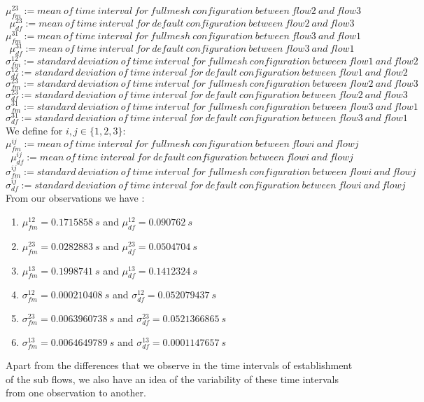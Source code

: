 \documentclass[a4paper,11pt]{article}
\begin{document}
			$$\mu_{fm}^{23} := mean\ of\ time\ interval\ for\ fullmesh\ configuration\ between\ flow2\ and\ flow3$$ 
			$$\mu_{df}^{23} := mean\ of\ time\ interval\ for\ default\ configuration\ between\ flow2\ and\ flow3$$
			$$\mu_{fm}^{31} := mean\ of\ time\ interval\ for\ fullmesh\ configuration\ between\ flow3\ and\ flow1$$ 
			$$\mu_{df}^{31} := mean\ of\ time\ interval\ for\ default\ configuration\ between\ flow3\ and\ flow1$$
			$$\sigma_{fm}^{12} := standard\ deviation\ of\ time\ interval\ for\ fullmesh\ configuration\ between\ flow1\ and\ flow2$$
			$$\sigma_{df}^{12} := standard\ deviation\ of\ time\ interval\ for\ default\ configuration\ between\ flow1\ and\ flow2$$
			$$\sigma_{fm}^{23} := standard\ deviation\ of\ time\ interval\ for\ fullmesh\ configuration\ between\ flow2\ and\ flow3$$
			$$\sigma_{df}^{23} := standard\ deviation\ of\ time\ interval\ for\ default\ configuration\ between\ flow2\ and\ flow3$$
			$$\sigma_{fm}^{31} := standard\ deviation\ of\ time\ interval\ for\ fullmesh\ configuration\ between\ flow3\ and\ flow1$$
			$$\sigma_{df}^{31} := standard\ deviation\ of\ time\ interval\ for\ default\ configuration\ between\ flow3\ and\ flow1$$
			\fi
			We define for $i,j \in \{1, 2, 3\}$:
			$$\mu_{fm}^{ij} := mean\ of\ time\ interval\ for\ fullmesh\ configuration\ between\ flowi\ and\ flowj$$ 
			$$\mu_{df}^{ij} := mean\ of\ time\ interval\ for\ default\ configuration\ between\ flowi\ and\ flowj$$
			$$\sigma_{fm}^{ij} := standard\ deviation\ of\ time\ interval\ for\ fullmesh\ configuration\ between\ flowi\ and\ flowj$$
			$$\sigma_{df}^{ij} := standard\ deviation\ of\ time\ interval\ for\ default\ configuration\ between\ flowi\ and\ flowj$$
			From our observations we have :
			\begin{enumerate}
				\item $\mu_{fm}^{12} = 0.1715858\ s$ and $\mu_{df}^{12} = 0.090762\ s$
				\item $\mu_{fm}^{23} = 0.0282883\ s$ and $\mu_{df}^{23} = 0.0504704\ s$
				\item $\mu_{fm}^{13} = 0.1998741\ s$ and $\mu_{df}^{13} = 0.1412324\ s$ \\
				\item $\sigma_{fm}^{12} = 0.000210408\ s$ and $\sigma_{df}^{12} = 0.052079437\ s$
				\item $\sigma_{fm}^{23} = 0.0063960738\ s$ and $\sigma_{df}^{23} = 0.0521366865\ s$
				\item $\sigma_{fm}^{13} = 0.0064649789\ s$ and $\sigma_{df}^{13} = 0.0001147657\ s$
			\end{enumerate}
			Apart from the differences that we observe in the time intervals of establishment of the sub flows, we also have an idea of the variability of these time intervals from one observation to another.
\end{document}
